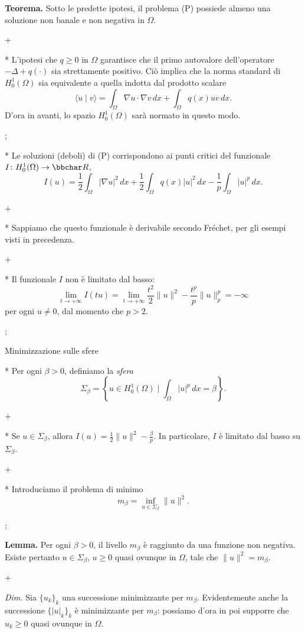 {\bf Teorema.} Sotto le predette ipotesi, il problema (P) possiede
almeno una soluzione non banale e non negativa in $\Omega$.

\pg+

* L'ipotesi che $q\geq 0$ in $\Omega$ garantisce che il primo
  autovalore dell'operatore $-\Delta + q(\cdot)$ sia strettamente
  positivo. Ci\`o implica che la norma standard di $H_0^1(\Omega)$ sia
  equivalente a quella indotta dal prodotto scalare
  $$
  \langle u\mid v \rangle = \int_\Omega \nabla u \cdot \nabla v \, dx
  + \int_\Omega q(x)uv\, dx.
  $$
  D'ora in avanti, lo spazio $H_0^1(\Omega)$ sar\`a normato in questo
  modo.

\pg;

* Le soluzioni (deboli) di (P) corrispondono ai punti critici del
  funzionale $I \colon H_0^1(\Omega) \to \R$,
  $$
  I(u) = \frac12 \int_\Omega |\nabla u|^2 \, dx + \frac12 \int_\Omega
  q(x) |u|^2 \, dx - \frac1p \int_\Omega |u|^{p}\, dx.
  $$

\pg+

* Sappiamo che questo funzionale \`e derivabile secondo Fr\'echet, per
  gli esempi visti in precedenza.

\pg+

* Il funzionale $I$ non \`e limitato dal basso:
$$
\lim_{t \to +\infty} I(tu) = \lim_{t \to +\infty} \frac{t^2}{2}
\|u\|^2 - \frac{t^p}{p} \|u\|_p^p = -\infty
$$
per ogni $u \neq 0$, dal momento che $p>2$.

\pg;

\sec Minimizzazione sulle sfere

* Per ogni $\beta>0$, definiamo la {\em sfera}
$$
\Sigma_\beta = \left\{ u \in H_0^1(\Omega) \mid \int_\Omega |u|^p \,
dx = \beta \right\}.
$$

\pg+

* Se $u \in \Sigma_\beta$, allora $I(u) = \frac{1}{2} \|u\|^2 -
  \frac{\beta}{p}$. In particolare, $I$ \`e limitato dal basso su
  $\Sigma_\beta$.

\pg+

* Introduciamo il problema di minimo
$$
m_\beta = \inf_{u \in \Sigma_\beta} \|u\|^2.
$$

\pg;

{\bf Lemma.} Per ogni $\beta>0$, il livello $m_\beta$ \`e raggiunto da
una funzione non negativa. Esiste pertanto $u \in \Sigma_\beta$, $u
\geq 0$ quasi ovunque in $\Omega$, tale che $\|u\|^2 = m_\beta$.

\pg+

{\em Dim.} Sia $\{u_k\}_k$ una successione minimizzante per
$m_\beta$. Evidentemente anche la successione $\{|u|_k\}_k$ \`e
minimizzante per $m_\beta$: possiamo d'ora in poi supporre che $u_k
\geq 0$ quasi ovunque in $\Omega$.

